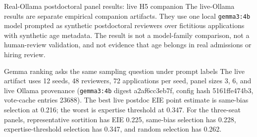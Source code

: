 \documentclass[
  ignorenonframetext,
]{beamer}
\begin{document}
\begin{frame}{Real-Ollama postdoctoral panel
results: live H5 companion}
\protect{}\label{real-ollama-postdoctoral-panel-results-live-h5-companion}
The live-Ollama results are separate empirical companion artifacts. They
use one local \texttt{gemma3:4b} model prompted as synthetic
postdoctoral reviewers over fictitious applications with synthetic age
metadata. The result is not a model-family comparison, not a
human-review validation, and not evidence that age belongs in real
admissions or hiring review.

\begin{block}{Gemma ranking asks the same sampling question under prompt
labels}
\protect{}\label{gemma-ranking-asks-the-same-sampling-question-under-prompt-labels}
The live artifact uses 12 seeds, 48 reviewers, 72 applications per seed,
panel sizes 3, 6, and live Ollama provenance (\texttt{gemma3:4b} digest
a2af6cc3eb7f, config hash 5161ffe474b3, vote-cache entries 23688). The
best live postdoc EIE point estimate is same-bias selection at 0.216;
the worst is expertise threshold at 0.347. For the three-seat panels,
representative sortition has EIE 0.225, same-bias selection has 0.228,
expertise-threshold selection has 0.347, and random selection has 0.262.


\end{block}
\end{frame}
\end{document}
